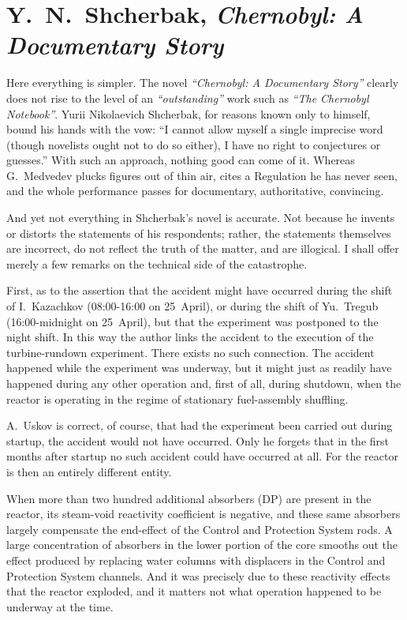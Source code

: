 \documentclass[openright]{bookest}
\begin{document}
\section{Y.~N.~Shcherbak, \textit{Chernobyl: A Documentary Story}}

Here everything is simpler. The novel \textit{``Chernobyl: A Documentary Story''} clearly does not rise to the level of an \textit{``outstanding''} work such as \textit{``The Chernobyl Notebook''}. Yurii Nikolaevich Shcherbak, for reasons known only to himself, bound his hands with the vow: ``I cannot allow myself a single imprecise word (though novelists ought not to do so either), I have no right to conjectures or guesses.'' With such an approach, nothing good can come of it. Whereas G.~Medvedev plucks figures out of thin air, cites a Regulation he has never seen, and the whole performance passes for documentary, authoritative, convincing.

And yet not everything in Shcherbak's novel is accurate. Not because he invents or distorts the statements of his respondents; rather, the statements themselves are incorrect, do not reflect the truth of the matter, and are illogical. I shall offer merely a few remarks on the technical side of the catastrophe.

First, as to the assertion that the accident might have occurred during the shift of I.~Kazachkov (08:00-16:00 on 25~April), or during the shift of Yu.~Tregub (16:00-midnight on 25~April), but that the experiment was postponed to the night shift. In this way the author links the accident to the execution of the turbine-rundown experiment. There exists no such connection. The accident happened while the experiment was underway, but it might just as readily have happened during any other operation and, first of all, during shutdown, when the reactor is operating in the regime of stationary fuel-assembly shuffling.

A.~Uskov is correct, of course, that had the experiment been carried out during startup, the accident would not have occurred. Only he forgets that in the first months after startup no such accident could have occurred at all. For the reactor is then an entirely different entity.

When more than two hundred additional absorbers (DP) are present in the reactor, its steam-void reactivity coefficient is negative, and these same absorbers largely compensate the end-effect of the Control and Protection System rods. A large concentration of absorbers in the lower portion of the core smooths out the effect produced by replacing water columns with displacers in the Control and Protection System channels. And it was precisely due to these reactivity effects that the reactor exploded, and it matters not what operation happened to be underway at the time.
\end{document}
